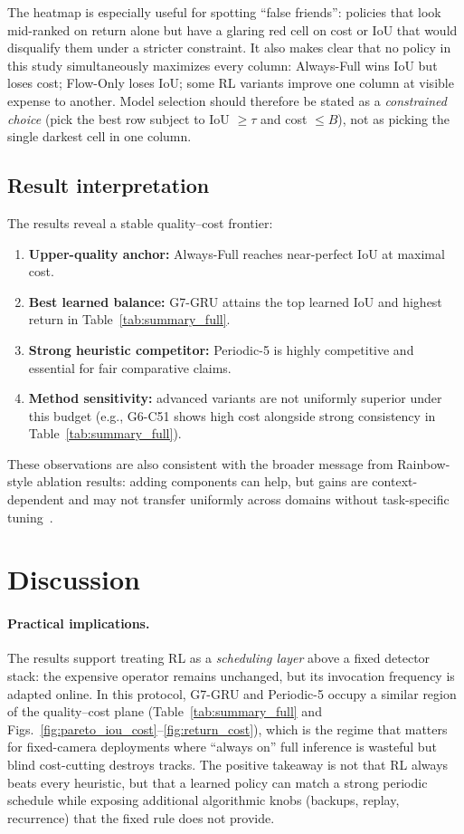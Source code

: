 \documentclass[letterpaper]{article}
\begin{document}
The heatmap is especially useful for spotting ``false friends'': policies that look mid-ranked on return alone but have a glaring red cell on cost or IoU that would disqualify them under a stricter constraint. It also makes clear that no policy in this study simultaneously maximizes every column: Always-Full wins IoU but loses cost; Flow-Only loses IoU; some RL variants improve one column at visible expense to another. Model selection should therefore be stated as a \emph{constrained choice} (pick the best row subject to IoU $\ge\tau$ and cost $\le B$), not as picking the single darkest cell in one column.

\subsection{Result interpretation}
The results reveal a stable quality--cost frontier:
\begin{enumerate}[leftmargin=1.4em]
    \item \textbf{Upper-quality anchor:} Always-Full reaches near-perfect IoU at maximal cost.
    \item \textbf{Best learned balance:} G7-GRU attains the top learned IoU and highest return in Table~\ref{tab:summary_full}.
    \item \textbf{Strong heuristic competitor:} Periodic-5 is highly competitive and essential for fair comparative claims.
    \item \textbf{Method sensitivity:} advanced variants are not uniformly superior under this budget (e.g., G6-C51 shows high cost alongside strong consistency in Table~\ref{tab:summary_full}).
\end{enumerate}
These observations are also consistent with the broader message from Rainbow-style ablation results: adding components can help, but gains are context-dependent and may not transfer uniformly across domains without task-specific tuning~\cite{hessel2018rainbow}.

\section{Discussion}

\paragraph{Practical implications.}
The results support treating RL as a \emph{scheduling layer} above a fixed detector stack: the expensive operator remains unchanged, but its invocation frequency is adapted online. In this protocol, G7-GRU and Periodic-5 occupy a similar region of the quality--cost plane (Table~\ref{tab:summary_full} and Figs.~\ref{fig:pareto_iou_cost}--\ref{fig:return_cost}), which is the regime that matters for fixed-camera deployments where ``always on'' full inference is wasteful but blind cost-cutting destroys tracks. The positive takeaway is not that RL always beats every heuristic, but that a learned policy can match a strong periodic schedule while exposing additional algorithmic knobs (backups, replay, recurrence) that the fixed rule does not provide.
\end{document}
